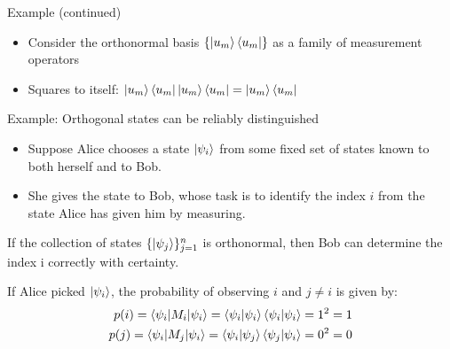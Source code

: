 \documentclass[handout, 10 pt]{beamer}
\begin{document}
\begin{frame}{Example (continued)}
\begin{itemize}
    \item Consider the orthonormal basis $\{\ket{u_m}\bra{u_m}\}$ as a family of measurement operators 
    \pause
    \item Squares to itself: 
    $\ket{u_m}\bra{u_m} \ket{u_m}\bra{u_m}=\ket{u_m}\bra{u_m}$
\end{itemize}
\end{frame}


\begin{frame}{Example: Orthogonal states can be reliably distinguished}
\begin{block}{}
\begin{itemize}
    \item Suppose Alice chooses a state $\ket{\psi_i}$ from some fixed set of states known to both herself and to Bob.
    \pause
    \item She gives the state to Bob, whose task is to identify the index $i$ from the state Alice has given him by measuring.
\end{itemize}
\end{block}
\pause

If the collection of states $\{\ket{\psi_j}\}_{j=1}^n$ is orthonormal, then Bob can determine the index i correctly with certainty.
\pause
\bigskip

If Alice picked $\ket{\psi_i}$, the probability of observing $i$ and $j\neq i$ is given by:
\begin{align}
p(i)=\braket{\psi_i | M_i |\psi_i}=\braket{\psi_i |\psi_i}\braket{\psi_i |\psi_i}=1^2=1\\
p(j)=\braket{\psi_i | M_j |\psi_i}=\braket{\psi_i |\psi_j}\braket{\psi_j |\psi_i}=0^2=0
\end{align}
\end{frame}
\end{document}
